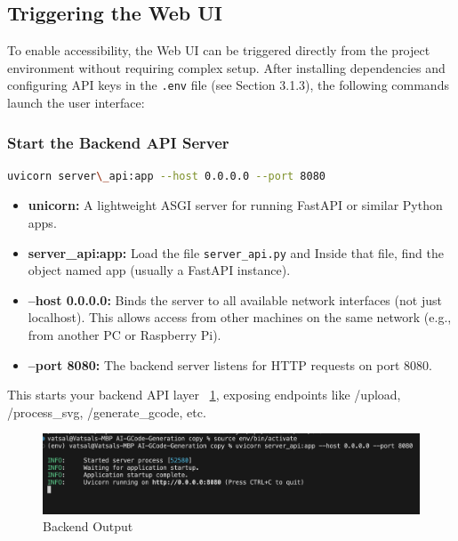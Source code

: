 \subsection{Triggering the Web UI}
To enable accessibility, the Web UI can be triggered directly from the project environment without requiring complex setup. After installing dependencies and configuring API keys in the  \texttt{.env} file (see Section 3.1.3), the following commands launch the user interface:

\subsubsection{Start the Backend API Server}

\begin{lstlisting}[language=bash,caption={Start backend Server}, label={lst:backend}]
uvicorn server\_api:app --host 0.0.0.0 --port 8080
\end{lstlisting}

\begin{itemize}
	\item \textbf{unicorn:} A lightweight ASGI server for running FastAPI or similar Python apps.
	\item \textbf{server\_api:app:} Load the file \texttt{server\_api.py} and Inside that file, find the object named app (usually a FastAPI instance).
	\item \textbf{--host 0.0.0.0:} Binds the server to all available network interfaces (not just localhost). This allows access from other machines on the same network (e.g., from another PC or Raspberry Pi).
	\item \textbf{--port 8080:} The backend server listens for HTTP requests on port 8080.
\end{itemize}
This starts your backend API layer ~\ref{unicorn}, exposing endpoints like /upload, /process\_svg, /generate\_gcode, etc.

\begin{figure}
	\begin{center}
		\includegraphics[width=1\linewidth]{Images/unicorn.png}
		\caption{Backend Output}
		\label{unicorn} 
	\end{center}
\end{figure}


